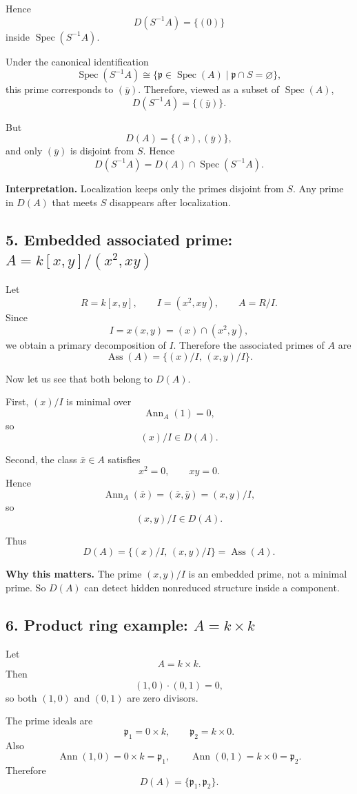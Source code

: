 \documentclass[12pt,a4paper,oneside]{report}
\DeclareMathOperator{\Spec}{Spec}
\DeclareMathOperator{\Ass}{Ass}
\DeclareMathOperator{\Ann}{Ann}
\theoremstyle{notespace}
\begin{document}
	Hence
	\[
	D(S^{-1}A)=\{(0)\}
	\]
	inside \(\Spec(S^{-1}A)\).
	
	Under the canonical identification
	\[
	\Spec(S^{-1}A)\cong
	\{\mathfrak p\in \Spec(A)\mid \mathfrak p\cap S=\varnothing\},
	\]
	this prime corresponds to \((\bar y)\). Therefore, viewed as a subset of \(\Spec(A)\),
	\[
	D(S^{-1}A)=\{(\bar y)\}.
	\]
	
	But
	\[
	D(A)=\{(\bar x),(\bar y)\},
	\]
	and only \((\bar y)\) is disjoint from \(S\). Hence
	\[
	D(S^{-1}A)=D(A)\cap \Spec(S^{-1}A).
	\]
	
	\medskip
	
	\noindent
	\textbf{Interpretation.}
	Localization keeps only the primes disjoint from \(S\). Any prime in \(D(A)\)
	that meets \(S\) disappears after localization.
	
	\subsection{5. Embedded associated prime: \(A=k[x,y]/(x^2,xy)\)}
	
	Let
	\[
	R=k[x,y],\qquad I=(x^2,xy),\qquad A=R/I.
	\]
	Since
	\[
	I=x(x,y)=(x)\cap(x^2,y),
	\]
	we obtain a primary decomposition of \(I\). Therefore the associated primes of \(A\) are
	\[
	\Ass(A)=\{(x)/I,\,(x,y)/I\}.
	\]
	
	Now let us see that both belong to \(D(A)\).
	
	First, \((x)/I\) is minimal over
	\[
	\Ann_A(1)=0,
	\]
	so
	\[
	(x)/I\in D(A).
	\]
	
	Second, the class \(\bar x\in A\) satisfies
	\[
	x^2=0,\qquad xy=0.
	\]
	Hence
	\[
	\Ann_A(\bar x)=(\bar x,\bar y)=(x,y)/I,
	\]
	so
	\[
	(x,y)/I\in D(A).
	\]
	
	Thus
	\[
	D(A)=\{(x)/I,\,(x,y)/I\}=\Ass(A).
	\]
	
	\medskip
	
	\noindent
	\textbf{Why this matters.}
	The prime \((x,y)/I\) is an embedded prime, not a minimal prime.
	So \(D(A)\) can detect hidden nonreduced structure inside a component.
	
	\subsection{6. Product ring example: \(A=k\times k\)}
	
	Let
	\[
	A=k\times k.
	\]
	Then
	\[
	(1,0)\cdot(0,1)=0,
	\]
	so both \((1,0)\) and \((0,1)\) are zero divisors.
	
	The prime ideals are
	\[
	\mathfrak p_1=0\times k,
	\qquad
	\mathfrak p_2=k\times 0.
	\]
	Also
	\[
	\Ann(1,0)=0\times k=\mathfrak p_1,
	\qquad
	\Ann(0,1)=k\times 0=\mathfrak p_2.
	\]
	Therefore
	\[
	D(A)=\{\mathfrak p_1,\mathfrak p_2\}.
	\]
	
\end{document}
